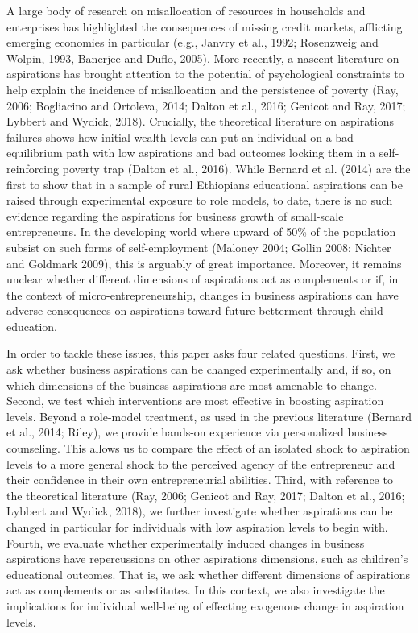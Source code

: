 \documentclass[11.5pt]{article}
\begin{document}
A large body of research on misallocation of resources in households and enterprises has highlighted the consequences of missing credit markets, afflicting emerging economies in particular (e.g., Janvry et al., 1992; Rosenzweig and Wolpin, 1993, Banerjee and Duflo, 2005). More recently, a nascent literature on aspirations has brought attention to the potential of psychological constraints to help explain the incidence of misallocation and the persistence of poverty (Ray, 2006; Bogliacino and Ortoleva, 2014; Dalton et al., 2016; Genicot and Ray, 2017; Lybbert and Wydick, 2018). Crucially, the theoretical literature on aspirations failures shows how initial wealth levels can put an individual on a bad equilibrium path with low aspirations and bad outcomes locking them in a self-reinforcing poverty trap (Dalton et al., 2016). While Bernard et al. (2014) are the first to show that in a sample of rural Ethiopians educational aspirations can be raised through experimental exposure to role models, to date, there is no such evidence regarding the aspirations for business growth of small-scale entrepreneurs. In the developing world where upward of 50\% of the population subsist on such forms of self-employment (Maloney 2004; Gollin 2008; Nichter and Goldmark 2009), this is arguably of great importance. Moreover, it remains unclear whether different dimensions of aspirations act as complements or if, in the context of micro-entrepreneurship, changes in business aspirations can have adverse consequences on aspirations toward future betterment through child education.

In order to tackle these issues, this paper asks four related questions. First, we ask whether business aspirations can be changed experimentally and, if so, on which dimensions of the business aspirations are most amenable to change. Second, we test which interventions are most effective in boosting aspiration levels. Beyond a role-model treatment, as used in the previous literature (Bernard et al., 2014; Riley), we provide hands-on experience via personalized business counseling. This allows us to compare the effect of an isolated shock to aspiration levels to a more general shock to the perceived agency of the entrepreneur and their confidence in their own entrepreneurial abilities. Third, with reference to the theoretical literature (Ray, 2006; Genicot and Ray, 2017; Dalton et al., 2016; Lybbert and Wydick, 2018), we further investigate whether aspirations can be changed in particular for individuals with low aspiration levels to begin with. Fourth, we evaluate whether experimentally induced changes in business aspirations have repercussions on other aspirations dimensions, such as children's educational outcomes. That is, we ask whether different dimensions of aspirations act as complements or as substitutes. In this context, we also investigate the implications for individual well-being of effecting exogenous change in aspiration levels.
\end{document}
